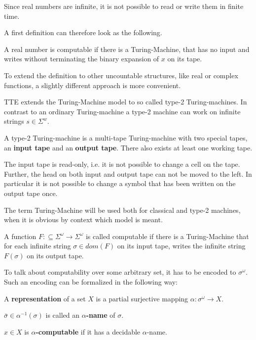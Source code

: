 Since real numbers are infinite, it is not possible to read or write them in
finite time.

A first definition can therefore look as the following.
\begin{definition}\label{def:computable real1}
 A real number is computable if there is a Turing-Machine, that has no input
 and writes without terminating the binary expansion of $x$ on its tape.
\end{definition}
To extend the definition to other uncountable structures, like real or complex
functions, a slightly different approach is more convenient.

TTE extends the Turing-Machine model to so called type-2 Turing-machines.
In contrast to an ordinary Turing-machine a type-2 machine can work on infinite strings $s \in \Sigma^w$. 
\begin{definition}
A type-2 Turing-machine is a multi-tape Turing-machine with two special tapes,
an \textbf{input tape} and an \textbf{output tape}.
There also exists at least one working tape. 

The input tape is read-only, i.e. it is not possible to change a cell on the
tape. 
Further, the head on both input and output tape can not be moved to the
left. 
In particular it is not possible to change a symbol that has been written
on the output tape once. 
\end{definition}
The term Turing-Machine will be used both for classical and type-2
machines, when it is obvious by context which model is meant.
\begin{definition}\label{def:computability_ttt}
A function $F:\subseteq \Sigma^\omega \to \Sigma^\omega$ is called computable if there is a Turing-Machine  
that for each infinite string $\sigma \in dom(F)$ on its input tape, writes the infinite string $F(\sigma)$ on its output tape. 
\end{definition}
To talk about computability over some arbitrary set, it has to be encoded to
$\sigma^\omega$. 
Such an encoding can be formalized in the following way:
\begin{definition}\label{def:representation}
	A \textbf{representation} of a set $X$ is a partial surjective mapping $\alpha: \sigma^\omega \to X$. 

	$\bar \sigma \in \alpha^{-1}(\sigma)$ is called an \textbf{$\alpha$-name} of $\sigma$. 

	$x \in X$ is \textbf{$\alpha$-computable} if it has a decidable $\alpha$-name.
\end{definition}


